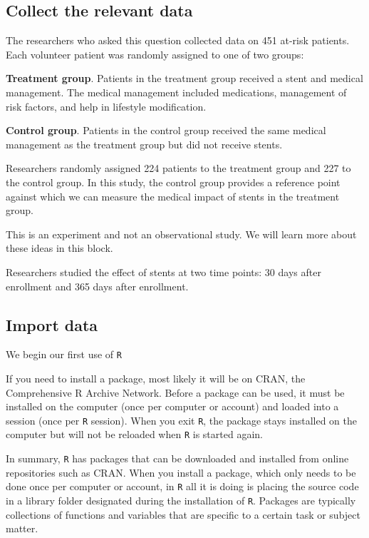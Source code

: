 \documentclass[
]{book}
\begin{document}
\hypertarget{collect-the-relevant-data}{%
\subsection{Collect the relevant data}\label{collect-the-relevant-data}}

The researchers who asked this question collected data on 451 at-risk patients. Each volunteer patient was randomly assigned to one of two groups:

\textbf{Treatment group}. Patients in the treatment group received a stent and medical management. The medical management included medications, management of risk factors, and help in lifestyle modification.

\textbf{Control group}. Patients in the control group received the same medical management as the treatment group but did not receive stents.

Researchers randomly assigned 224 patients to the treatment group and 227 to the control group. In this study, the control group provides a reference point against which we can measure the medical impact of stents in the treatment group.

This is an experiment and not an observational study. We will learn more about these ideas in this block.

Researchers studied the effect of stents at two time points: 30 days after enrollment and 365 days after enrollment.

\hypertarget{import-data}{%
\subsection{Import data}\label{import-data}}

We begin our first use of \texttt{R}

If you need to install a package, most likely it will be on CRAN, the Comprehensive R Archive Network. Before
a package can be used, it must be installed on the computer (once per computer or account) and loaded into a session (once per \texttt{R} session). When you exit \texttt{R}, the package stays installed on the computer but will not be reloaded when \texttt{R} is started again.

In summary, \texttt{R} has packages that can be downloaded and installed from online repositories such as CRAN. When you install a package, which only needs to be done once per computer or account, in \texttt{R} all it is doing is placing the source code in a library folder designated during the installation of \texttt{R}. Packages are typically collections of functions and variables that are specific to a certain task or subject matter.
\end{document}
